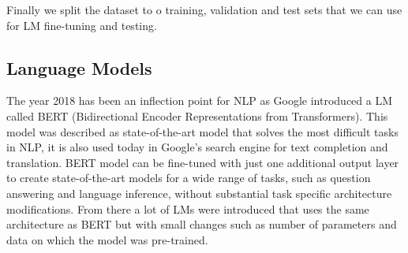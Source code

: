 \documentclass[conference]{IEEEtran}
\begin{document}
\begin{table}[htp]
\centering
{}
\vspace{0.4cm}
\caption{Examples of FEVER claims and labels.}
\label{tab:fever_example}
\end{table}

Finally we split the dataset to o training, validation and test sets that we can use for LM fine-tuning and testing.

\begin{table}[htp]
\centering
{}
\vspace{0.4cm}
\caption{Dataset split sizes for SUPPORTS, REFUTES and NOTENOUGHINFO (NEI) classes.}
\label{tab:fever_splits}
\end{table}

\subsection{Language Models}
The year 2018 has been an inflection point for NLP as Google introduced a LM called BERT (Bidirectional Encoder Representations from Transformers)\cite{devlin2018bert}. This model was described as state-of-the-art model that solves the most difficult tasks in NLP, it is also used today in Google's search engine for text completion and translation. BERT model can be fine-tuned with just one additional output layer to create state-of-the-art models for a wide range of tasks, such as question answering and language inference, without substantial task specific architecture modifications. From there a lot of LMs were introduced that uses the same architecture as BERT but with small changes such as number of parameters and data on which the model was pre-trained.
\end{document}
